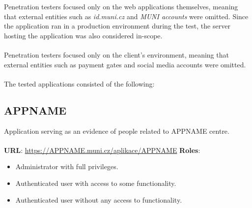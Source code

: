 \documentclass{article}
\begin{document}
Penetration testers focused only on the web applications themselves, meaning that external entities such as \textit{id.muni.cz} and \textit{MUNI accounts} were omitted. Since the application ran in a production environment during the test, the server hosting the application was also considered in-scope.
\\
\\
Penetration testers focused only on the client's environment, meaning that external entities such as payment gates and social media accounts were omitted. 
\\
\\
The tested applications consisted of the following:
\subsection*{APPNAME}
Application serving as an evidence of people related to APPNAME centre.\\
\\
\textbf{URL}: \href{https://APPNAME.muni.cz/aplikace/APPNAME}{https://APPNAME.muni.cz/aplikace/APPNAME}
\textbf{Roles}: 
\begin{itemize}
    \item Administrator with full privileges.
    \item Authenticated user with access to some  functionality.
    \item Authenticated user without any access to  functionality.
\end{itemize}
\end{document}
